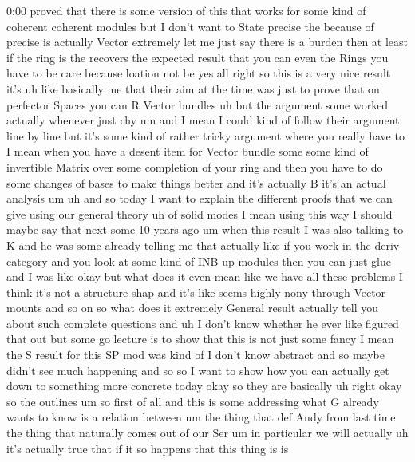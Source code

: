 \begin{unfinished}{0:00}
proved  that  there  is  some  version  of
this  that  works  for  some  kind  of
coherent  coherent  modules  but  I  don't
want  to  State  precise  the  because  of
precise  is  actually
Vector  extremely  let  me  just  say  there
is  a
burden  then  at  least  if  the  ring  is  the
recovers  the  expected  result  that  you
can
even  the  Rings  you  have  to  be
care  because  loation  not
be
yes
all  right  so  this  is  a  very  nice  result
it's
uh  like  basically  me  that  their  aim  at
the  time  was  just  to  prove  that  on
perfector  Spaces  you  can  R  Vector
bundles  uh  but  the  argument  some  worked
actually  whenever  just  chy
um  and  I  mean  I  could  kind  of  follow
their  argument  line  by  line  but  it's
some  kind  of  rather  tricky  argument
where  you  really  have  to  I  mean  when  you
have  a  desent  item  for  Vector  bundle
some  some  kind  of  invertible  Matrix  over
some  completion  of  your  ring  and  then
you  have  to  do  some  changes  of  bases  to
make  things  better  and  it's  actually
B  it's  an  actual
analysis
um  uh  and  so  today  I  want  to  explain  the
different  proofs  that  we  can  give  using
our  general  theory
uh  of  solid
modes
I  mean
using  this
way  I  should  maybe  say  that  next  some  10
years  ago  um  when  this  result  I  was  also
talking  to  K
and  he  was  some  already  telling  me  that
actually  like  if  you  work  in  the  deriv
category  and  you  look  at  some  kind  of
INB  up  modules  then  you  can  just  glue
and  I  was  like  okay  but  what  does  it
even  mean  like  we  have  all  these
problems  I  think  it's  not  a  structure
shap  and  it's  like  seems  highly  nony
through  Vector  mounts  and  so  on
so  what  does  it  extremely  General  result
actually  tell  you  about  such  complete
questions  and  uh  I  don't  know  whether  he
ever  like  figured  that  out  but  some  go
lecture  is  to  show  that  this  is  not  just
some
fancy  I  mean  the  S  result  for  this  SP
mod  was  kind  of  I  don't  know  abstract
and  so  maybe  didn't  see  much  happening
and  so  so  I  want  to  show  how  you  can
actually  get  down  to  something  more
concrete
today  okay  so  they  are  basically
uh
right  okay  so  the
outlines
um  so  first  of  all  and  this  is  some
addressing  what  G  already  wants  to  know
is  a  relation
between  um  the  thing  that
def
Andy  from  last
time  the  thing  that  naturally  comes  out
of  our
Ser
um  in  particular  we  will
actually  uh  it's  actually  true  that  if
it  so  happens  that  this  thing  is  is

\end{unfinished}
